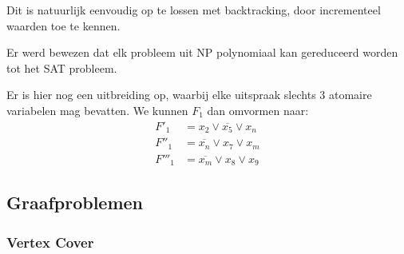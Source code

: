 \documentclass{report}
\begin{document}
Dit is natuurlijk eenvoudig op te lossen met backtracking, door incrementeel waarden toe te kennen.

Er werd bewezen dat elk probleem uit NP polynomiaal kan gereduceerd worden tot het SAT probleem. 

Er is hier nog een uitbreiding op, waarbij elke uitspraak slechts 3 atomaire variabelen mag bevatten. We kunnen $F_1$ dan omvormen naar:
\begin{equation*}
	\begin{split}
		F'_1  & = x_2 \vee \overline{x_5} \vee x_n \\
		F''_1  & = \overline{x_n} \vee x_7 \vee x_m \\
		F'''_1 & = \overline{x_m} \vee x_8 \vee x_9
	\end{split}
\end{equation*}

\subsection{Graafproblemen}
\subsubsection{Vertex Cover}
\end{document}
